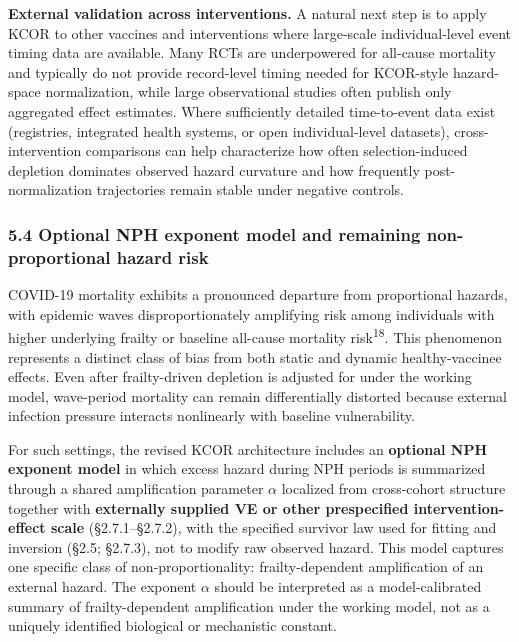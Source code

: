 \documentclass[
]{article}
\begin{document}
\textbf{External validation across interventions.} A natural next step is to apply KCOR to other vaccines and interventions where large-scale individual-level event timing data are available. Many RCTs are underpowered for all-cause mortality and typically do not provide record-level timing needed for KCOR-style hazard-space normalization, while large observational studies often publish only aggregated effect estimates. Where sufficiently detailed time-to-event data exist (registries, integrated health systems, or open individual-level datasets), cross-intervention comparisons can help characterize how often selection-induced depletion dominates observed hazard curvature and how frequently post-normalization trajectories remain stable under negative controls.

\subsubsection{5.4 Optional NPH exponent model and remaining non-proportional hazard risk}\label{optional-nph-exponent-model-and-remaining-non-proportional-hazard-risk}

COVID-19 mortality exhibits a pronounced departure from proportional hazards, with epidemic waves disproportionately amplifying risk among individuals with higher underlying frailty or baseline all-cause mortality risk\textsuperscript{18}. This phenomenon represents a distinct class of bias from both static and dynamic healthy-vaccinee effects. Even after frailty-driven depletion is adjusted for under the working model, wave-period mortality can remain differentially distorted because external infection pressure interacts nonlinearly with baseline vulnerability.

For such settings, the revised KCOR architecture includes an \textbf{optional NPH exponent model} in which excess hazard during NPH periods is summarized through a shared amplification parameter \(\alpha\) localized from cross-cohort structure together with \textbf{externally supplied VE or other prespecified intervention-effect scale} (§2.7.1--§2.7.2), with the specified survivor law used for fitting and inversion (§2.5; §2.7.3), not to modify raw observed hazard. This model captures one specific class of non-proportionality: frailty-dependent amplification of an external hazard. The exponent \(\alpha\) should be interpreted as a model-calibrated summary of frailty-dependent amplification under the working model, not as a uniquely identified biological or mechanistic constant.
\end{document}
